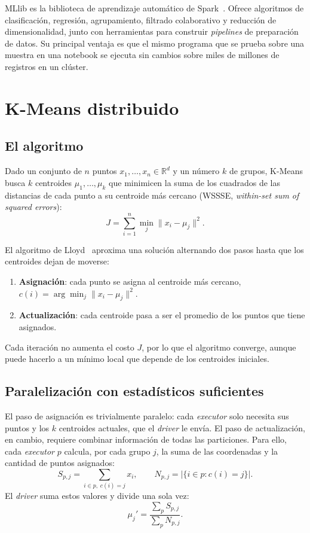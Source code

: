 \documentclass[conference,a4paper]{IEEEtran}
\begin{document}
MLlib es la biblioteca de aprendizaje automático de Spark~\cite{meng2016mllib}. Ofrece algoritmos de clasificación, regresión, agrupamiento, filtrado colaborativo y reducción de dimensionalidad, junto con herramientas para construir \textit{pipelines} de preparación de datos. Su principal ventaja es que el mismo programa que se prueba sobre una muestra en una notebook se ejecuta sin cambios sobre miles de millones de registros en un clúster.

\section{K-Means distribuido}
\label{sec:kmeans}

\subsection{El algoritmo}

Dado un conjunto de $n$ puntos $x_1,\ldots,x_n \in \mathbb{R}^d$ y un número $k$ de grupos, K-Means busca $k$ centroides $\mu_1,\ldots,\mu_k$ que minimicen la suma de los cuadrados de las distancias de cada punto a su centroide más cercano (WSSSE, \textit{within-set sum of squared errors}):
\begin{equation}
J = \sum_{i=1}^{n} \min_{j} \lVert x_i - \mu_j \rVert^2 .
\label{eq:costo}
\end{equation}

El algoritmo de Lloyd~\cite{lloyd1982,macqueen1967} aproxima una solución alternando dos pasos hasta que los centroides dejan de moverse:
\begin{enumerate}
\item \textbf{Asignación}: cada punto se asigna al centroide más cercano, $c(i) = \arg\min_j \lVert x_i - \mu_j \rVert^2$.
\item \textbf{Actualización}: cada centroide pasa a ser el promedio de los puntos que tiene asignados.
\end{enumerate}
Cada iteración no aumenta el costo $J$, por lo que el algoritmo converge, aunque puede hacerlo a un mínimo local que depende de los centroides iniciales.

\subsection{Paralelización con estadísticos suficientes}

El paso de asignación es trivialmente paralelo: cada \textit{executor} solo necesita sus puntos y los $k$ centroides actuales, que el \textit{driver} le envía. El paso de actualización, en cambio, requiere combinar información de todas las particiones. Para ello, cada \textit{executor} $p$ calcula, por cada grupo $j$, la suma de las coordenadas y la cantidad de puntos asignados:
\begin{equation}
S_{p,j} = \sum_{i \in p,\; c(i)=j} x_i, \qquad N_{p,j} = \bigl|\{ i \in p : c(i)=j \}\bigr| .
\end{equation}
El \textit{driver} suma estos valores y divide una sola vez:
\begin{equation}
\mu_j' = \frac{\sum_p S_{p,j}}{\sum_p N_{p,j}} .
\label{eq:centroide}
\end{equation}
\end{document}
